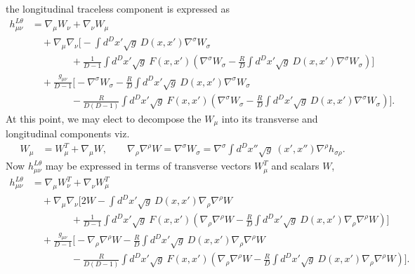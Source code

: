 \documentclass[10pt,letterpaper]{article}
\begin{document}
\newpage
the longitudinal traceless component is expressed as
\begin{align}
h_{\mu\nu}^{L\theta} &= \nabla_\mu W_\nu + \nabla_\nu W_\mu 
\nonumber\\
 &\quad+ \nabla_\mu\nabla_\nu \bigg[ - \int d^Dx' \sqrt{g}\ D(x,x')\nabla^\sigma W_\sigma
\nonumber\\
&\qquad\qquad
+ \frac{1}{D-1} \int d^Dx' \sqrt{g}\ F(x,x') \left( \nabla^\sigma W_\sigma-\frac{R}{D}\int d^Dx' \sqrt{g}\ D(x,x')\nabla^\sigma W_\sigma\right)\bigg]
\nonumber\\
&\quad + \frac{g_{\mu\nu}}{D-1}\bigg[ - \nabla^\sigma W_\sigma - \frac{R}{D} \int d^Dx' \sqrt{g}\ D(x,x')\nabla^\sigma W_\sigma 
\nonumber \\
&\qquad\qquad
- \frac{R}{D(D-1)} \int d^Dx' \sqrt{g}\ F(x,x') \left( \nabla^\sigma W_\sigma-\frac{R}{D}\int d^Dx' \sqrt{g}\ D(x,x')\nabla^\sigma W_\sigma\right)\bigg].
\end{align}
At this point, we may elect to decompose the $W_{\mu}$ into its transverse and longitudinal components viz. 
\begin{align}
W_\mu &= W_\mu^T + \nabla_\mu W,\qquad 
\nabla_\rho \nabla^\rho W = \nabla^\sigma W_\sigma =\nabla^\sigma \int d^Dx'' \sqrt{g}\ (x',x'') \nabla^\rho h_{\sigma\rho}.
\end{align}
Now $h_{\mu\nu}^{L\theta}$ may be expressed in terms of transverse vectors $W^T_{\mu}$ and scalars $W$,
\begin{align}
h_{\mu\nu}^{L\theta} &= \nabla_\mu W_\nu^T + \nabla_\nu W_\mu^T  
\nonumber\\
&\quad + \nabla_\mu\nabla_\nu \bigg[ 2W- \int d^Dx' \sqrt{g}\ D(x,x')\nabla_\rho \nabla^\rho W
\nonumber\\
&\qquad \qquad + \frac{1}{D-1} \int d^Dx' \sqrt{g}\ F(x,x') \left( \nabla_\rho \nabla^\rho W-\frac{R}{D}\int d^Dx' \sqrt{g}\ D(x,x')\nabla_\rho \nabla^\rho W\right)\bigg]
\nonumber\\
&\quad + \frac{g_{\mu\nu}}{D-1}\bigg[ -\nabla_\rho \nabla^\rho W - \frac{R}{D} \int d^Dx' \sqrt{g}\ D(x,x')\nabla_\rho \nabla^\rho W 
\nonumber \\
&\qquad\qquad 
- \frac{R}{D(D-1)} \int d^Dx' \sqrt{g}\ F(x,x') \left(\nabla_\rho \nabla^\rho W-\frac{R}{D}\int d^Dx' \sqrt{g}\ D(x,x')\nabla_\rho \nabla^\rho W\right)\bigg].
\end{align}
\end{document}
